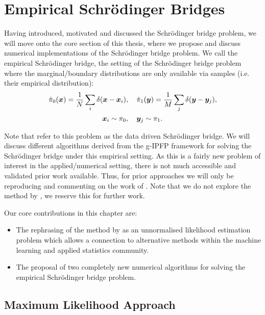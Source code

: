 \documentclass[a4paper,12pt,twoside,openright]{report}
\theoremstyle{definition}
\begin{document}
\chapter{Empirical Schrödinger Bridges}

Having introduced, motivated and discussed the Schrödinger bridge problem, we will move onto the core section of this thesis, where we propose and discuss numerical implementations of the Schrödinger bridge problem. We call the empirical Schrödinger bridge, the setting of the Schrödinger bridge problem where the marginal/boundary distributions are only available via samples (i.e. their empirical distribution):
\begin{align}
    \hat{\pi}_0({\bm{x}})  = \frac{1}{N}\sum_i \delta({\bm{x}} -{\bm{x}}_i) &, \quad\hat{\pi}_1({\bm{y}})  = \frac{1}{M}\sum_j \delta({\bm{y}} -{\bm{y}}_j), \nonumber\\
    {\bm{x}}_i \sim \pi_0 &, \quad {\bm{y}}_j \sim \pi_1.
\end{align}

Note that \cite{pavon2018data} refer to this problem as the data driven Schrödinger bridge. We will discuss different algorithms derived from the g-IPFP framework for solving the Schrödinger bridge under this empirical setting. As this is a fairly new problem of interest in the applied/numerical setting, there is not much accessible and validated prior work available. Thus, for prior approaches we will only be reproducing and commenting on the work of \cite{pavon2018data}. Note that we do not explore the method by \cite{bernton2019schr}, we reserve this for further work.

Our core contributions in this chapter are:

\begin{itemize}
    \item The rephrasing of the method by \cite{pavon2018data} as an unnormalised likelihood estimation problem which allows a connection to alternative methods within the machine learning and applied statistics community.
    \item The proposal of two completely new numerical algorithms for solving the empirical Schrödinger bridge problem.
\end{itemize}



\section{Maximum Likelihood Approach \citep{pavon2018data}}
\end{document}
